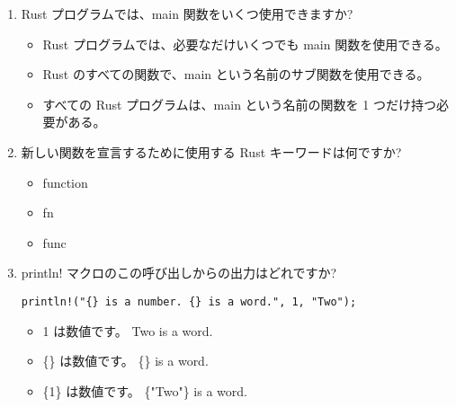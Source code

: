 \begin{enumerate}
\item Rust プログラムでは、main 関数をいくつ使用できますか?
\begin{itemize}
\item Rust プログラムでは、必要なだけいくつでも main 関数を使用できる。
\item Rust のすべての関数で、main という名前のサブ関数を使用できる。
\item すべての Rust プログラムは、main という名前の関数を 1 つだけ持つ必要がある。
\end{itemize}

\item 新しい関数を宣言するために使用する Rust キーワードは何ですか?
\begin{itemize}
\item function
\item fn
\item func
\end{itemize}

\item println! マクロのこの呼び出しからの出力はどれですか?

\texttt{println!("\{\} is a number. \{\} is a word.", 1, "Two");}
\begin{itemize}
\item 1 は数値です。 Two is a word.
\item \{\} は数値です。 \{\} is a word.
\item \{1\} は数値です。 \{"Two"\} is a word.
\end{itemize}

\end{enumerate}



